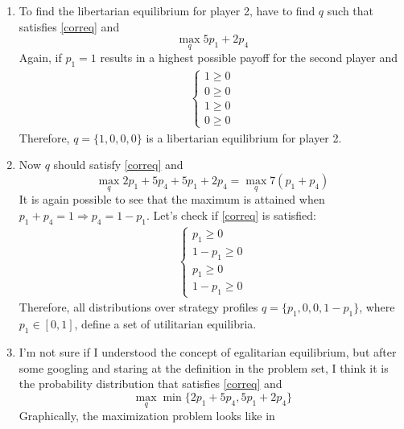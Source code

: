 \documentclass[]{article}
\begin{document}
\begin{enumerate}[label = \roman*)]
	\item To find the libertarian equilibrium for player 2, have to find $q$ such that satisfies \eqref{correq} and 
	\begin{equation}
		\max\limits_{q} 5p_1 + 2p_4 \nonumber
	\end{equation}
	Again, if $p_1 = 1$ results in a highest possible payoff for the second player and
	\begin{equation}
		\begin{split}
			\begin{cases}
				1 \geq 0 \\
				0 \geq 0 \\
				1 \geq 0 \\
				0 \geq 0
			\end{cases} \nonumber
		\end{split}
	\end{equation}
	Therefore, $q = \{1, 0, 0, 0\}$ is a libertarian equilibrium for player 2.
	
	\item Now $q$ should satisfy \eqref{correq} and 
	\begin{equation}
		\max\limits_{q} 2p_1 + 5p_4 + 5p_1 + 2p_4 = \max\limits_{q}7(p_1 + p_4) \nonumber
	\end{equation}
	It is again possible to see that the maximum is attained when $p_1 + p_4 = 1 \Longrightarrow p_4 = 1 - p_1$. Let's check if \eqref{correq} is satisfied:
	\begin{equation}
		\begin{split}
			\begin{cases}
				p_1 \geq 0 \\
				1 - p_1 \geq 0 \\
				p_1 \geq 0 \\
				1 - p_1 \geq 0
			\end{cases} \nonumber
		\end{split}
	\end{equation}
	Therefore, all distributions over strategy profiles $q = \{p_1, 0, 0, 1 - p_1\}$, where $p_1\in[0, 1]$, define a set of utilitarian equilibria.
	
	\item I'm not sure if I understood the concept of egalitarian equilibrium, but after some googling and staring at the definition in the problem set, I think it is the probability distribution that satisfies \eqref{correq} and 
	\begin{equation}
		\max\limits_{q}\min\{2p_1 + 5p_4, 5p_1 + 2p_4\}\nonumber
	\end{equation}
	Graphically, the maximization problem looks like in 
	

\end{enumerate}
\end{document}

